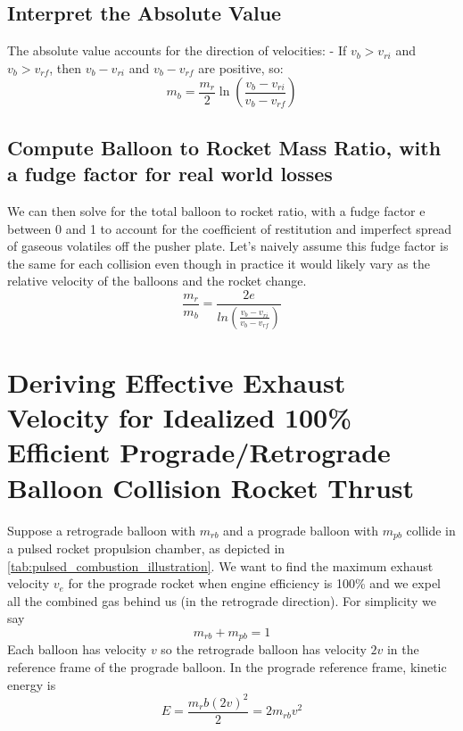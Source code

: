 \documentclass{article}
\begin{document}
\subsection{Interpret the Absolute Value}   
The absolute value accounts for the direction of velocities:
- If \( v_b > v_{ri} \) and \( v_b > v_{rf} \),  then \( v_b - v_{ri} \) and \( v_b - v_{rf} \) are positive, so:
\[
m_b = \frac{m_r}{2} \ln \left( \frac{v_b - v_{ri}}{v_b - v_{rf}} \right)
\]
\subsection{Compute Balloon to Rocket Mass Ratio, with a fudge factor for real world losses}

We can then solve for the total balloon to rocket ratio, with a fudge factor e between 0 and 1 to account for the coefficient of restitution and imperfect spread of gaseous volatiles off the pusher plate.   Let's naively assume this fudge factor is the same for each collision even though in practice it would likely vary as the relative velocity of the balloons and the rocket change.
\begin{equation}
\frac{m_r}{m_b} = \frac{2e}{ln(\frac{v_b-v_{ri}}{v_b-v_{rf}})}\label{eq:balloon_ratio}
\end{equation}

\section{Deriving Effective Exhaust Velocity for Idealized 100\% Efficient Prograde/Retrograde Balloon Collision Rocket Thrust}\label{sec:dv_effective}
Suppose a retrograde balloon with $m_{rb}$ and a prograde balloon with $m_{pb}$ collide in a pulsed rocket propulsion chamber, as depicted in \autoref{tab:pulsed_combustion_illustration}.  We want to find the maximum exhaust velocity $v_e$ for the prograde rocket  when engine efficiency is 100\% and we expel all the combined gas behind us (in the retrograde direction).   For simplicity we say 
\begin{equation}
m_{rb} + m_{pb} = 1\label{eq:mass_is_1}
\end{equation} 
Each balloon has velocity $v$ so the retrograde balloon has velocity $2v$ in the reference frame of the prograde balloon.   In the prograde reference frame, kinetic energy is
\begin{equation}
E = \frac{m_rb (2v)^2}{2} = 2m_{rb}v^2\label{eq:ke_balloons}
\end{equation}
\end{document}
